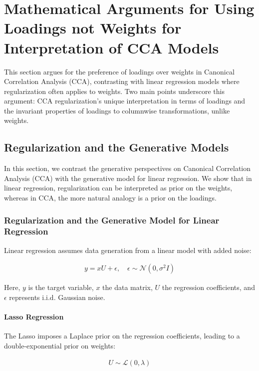 \section{Mathematical Arguments for Using Loadings not Weights for Interpretation of CCA Models}\label{sec:an-argument-for-the-use-of-loadings}

This section argues for the preference of loadings over weights in Canonical Correlation Analysis (CCA), contrasting with linear regression models where regularization often applies to weights.
Two main points underscore this argument: CCA regularization’s unique interpretation in terms of loadings and the invariant properties of loadings to columnwise transformations, unlike weights.


\subsection{Regularization and the Generative Models}
In this section, we contrast the generative perspectives on Canonical Correlation Analysis (CCA) with the generative model for linear regression.
We show that in linear regression, regularization can be interpreted as prior on the weights, whereas in CCA, the more natural analogy is a prior on the loadings.

\subsubsection{Regularization and the Generative Model for Linear Regression}
Linear regression assumes data generation from a linear model with added noise:

\begin{align}
    y = xU + \epsilon, \quad \epsilon \sim \mathcal{N}(0, \sigma^2 I)
\end{align}

Here, $y$ is the target variable, $x$ the data matrix, $U$ the regression coefficients, and $\epsilon$ represents i.i.d. Gaussian noise.

\paragraph{Lasso Regression}
The Lasso imposes a Laplace prior on the regression coefficients, leading to a double-exponential prior on weights:

\begin{align}
    U \sim \mathcal{L}(0, \lambda)
\end{align}

